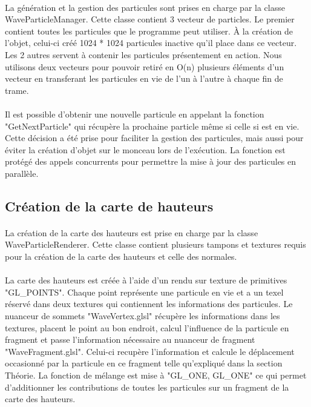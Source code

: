 \documentclass[a4paper, 12pt]{article} %
\begin{document}
	\paragraph{}
	La génération et la gestion des particules sont prises en charge par la classe WaveParticleManager. Cette classe contient 3 vecteur de particles.
	Le premier contient toutes les particules que le programme peut utiliser. À la création de l'objet, celui-ci créé 1024 * 1024 particules inactive 
	qu'il place dans ce vecteur. Les 2 autres servent à contenir les particules présentement en action. Nous utilisons deux vecteurs pour pouvoir 
	retiré en O(n) plusieurs éléments d'un vecteur en transferant les particules en vie de l'un à l'autre à chaque fin de trame. 
    
	\paragraph{}
	Il est possible d'obtenir une nouvelle particule en appelant la fonction "GetNextParticle" qui récupère la prochaine particle même si celle si est en vie.
	Cette décision a été prise pour faciliter la gestion des particules, mais aussi pour éviter la création d'objet sur le monceau lors de l'exécution. La 
	fonction est protégé des appels concurrents pour permettre la mise à jour des particules en parallèle.
\subsection{Création de la carte de hauteurs}
	\paragraph{}
	La création de la carte des hauteurs est prise en charge par la classe WaveParticleRenderer. Cette classe contient plusieurs tampons et textures requis
	pour la création de la carte des hauteurs et celle des normales.
	
	\paragraph{}
	La carte des hauteurs est créée à l'aide d'un rendu sur texture de primitives "GL\_POINTS". Chaque point représente une particule en vie et a un texel réservé
	dans deux textures qui contiennent les informations des particules. Le nuanceur de sommets "WaveVertex.glsl" récupère les informations dans les textures, 
	placent le point au bon endroit, calcul l'influence de la particule en fragment et passe l'information nécessaire au nuanceur de fragment "WaveFragment.glsl".
	Celui-ci recupère l'information et calcule le déplacement occasionné par la particule en ce fragment telle qu'expliqué dans la section Théorie. La fonction 
	de mélange est mise à "GL\_ONE, GL\_ONE" ce qui permet d'additionner les contributions de toutes les particules sur un fragment de la carte des hauteurs.
\end{document}
